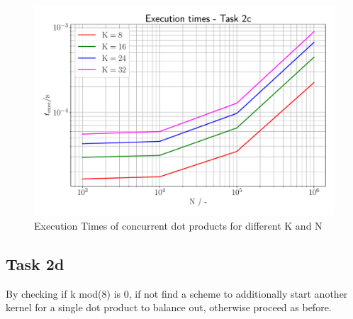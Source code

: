 \begin{figure}[h]
    \begin{center}
        \includegraphics[width=15cm]{figures/task_2_c.pdf}
        \caption{Execution Times of concurrent dot products for different $\mathrm{K}$ and $\mathrm{N}$}
    \end{center}
\end{figure}

\subsection{Task 2d}

By checking if k mod(8) is 0, if not find a scheme to additionally start another kernel for a single dot product to balance out, otherwise 
proceed as before.